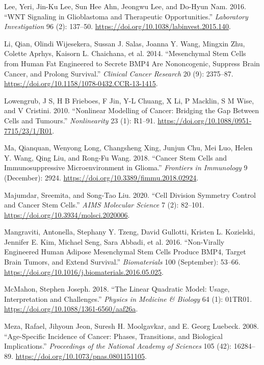 \documentclass[
  letterpaper,
]{scrreprt}
\newlength{\cslhangindent}
\newenvironment{CSLReferences}[2] %
 {\begin{list}{}{%
  \setlength{\itemindent}{0pt}
  \setlength{\leftmargin}{0pt}
  \setlength{\parsep}{0pt}
  \ifodd #1
   \setlength{\leftmargin}{\cslhangindent}
   \setlength{\itemindent}{-1\cslhangindent}
  \fi
  \setlength{\itemsep}{#2\baselineskip}}}
 {\end{list}}
\theoremstyle{definition}
\theoremstyle{remark}
\begin{document}
\begin{CSLReferences}{1}{0}
Lee, Yeri, Jin-Ku Lee, Sun Hee Ahn, Jeongwu Lee, and Do-Hyun Nam. 2016.
{``WNT Signaling in Glioblastoma and Therapeutic Opportunities.''}
\emph{Laboratory Investigation} 96 (2): 137--50.
\url{https://doi.org/10.1038/labinvest.2015.140}.

Li, Qian, Olindi Wijesekera, Sussan J. Salas, Joanna Y. Wang, Mingxin
Zhu, Colette Aprhys, Kaisorn L. Chaichana, et al. 2014. {``Mesenchymal
Stem Cells from Human Fat Engineered to Secrete BMP4 Are Nononcogenic,
Suppress Brain Cancer, and Prolong Survival.''} \emph{Clinical Cancer
Research} 20 (9): 2375--87.
\url{https://doi.org/10.1158/1078-0432.CCR-13-1415}.

Lowengrub, J S, H B Frieboes, F Jin, Y-L Chuang, X Li, P Macklin, S M
Wise, and V Cristini. 2010. {``Nonlinear Modelling of Cancer: Bridging
the Gap Between Cells and Tumours.''} \emph{Nonlinearity} 23 (1):
R1--91. \url{https://doi.org/10.1088/0951-7715/23/1/R01}.

Ma, Qianquan, Wenyong Long, Changsheng Xing, Junjun Chu, Mei Luo, Helen
Y. Wang, Qing Liu, and Rong-Fu Wang. 2018. {``Cancer Stem Cells and
Immunosuppressive Microenvironment in Glioma.''} \emph{Frontiers in
Immunology} 9 (December): 2924.
\url{https://doi.org/10.3389/fimmu.2018.02924}.

Majumdar, Sreemita, and Song-Tao Liu. 2020. {``Cell Division Symmetry
Control and Cancer Stem Cells.''} \emph{AIMS Molecular Science} 7 (2):
82--101. \url{https://doi.org/10.3934/molsci.2020006}.

Mangraviti, Antonella, Stephany Y. Tzeng, David Gullotti, Kristen L.
Kozielski, Jennifer E. Kim, Michael Seng, Sara Abbadi, et al. 2016.
{``Non-Virally Engineered Human Adipose Mesenchymal Stem Cells Produce
BMP4, Target Brain Tumors, and Extend Survival.''} \emph{Biomaterials}
100 (September): 53--66.
\url{https://doi.org/10.1016/j.biomaterials.2016.05.025}.

McMahon, Stephen Joseph. 2018. {``The Linear Quadratic Model: Usage,
Interpretation and Challenges.''} \emph{Physics in Medicine \& Biology}
64 (1): 01TR01. \url{https://doi.org/10.1088/1361-6560/aaf26a}.

Meza, Rafael, Jihyoun Jeon, Suresh H. Moolgavkar, and E. Georg Luebeck.
2008. {``Age-Specific Incidence of Cancer: Phases, Transitions, and
Biological Implications.''} \emph{Proceedings of the National Academy of
Sciences} 105 (42): 16284--89.
\url{https://doi.org/10.1073/pnas.0801151105}.


\end{CSLReferences}
\end{document}
